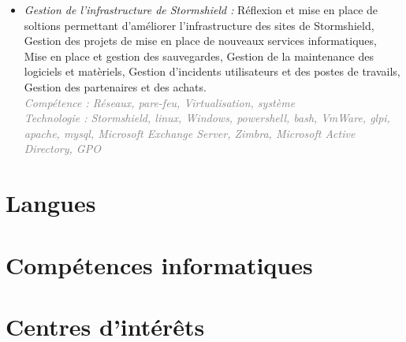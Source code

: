                 {
                \begin{itemize}
					\item \textit{Gestion de l'infrastructure de Stormshield :}
					\tabto{0.3cm} Réflexion et mise en place de soltions permettant d'améliorer l'infrastructure des sites de Stormshield, Gestion des projets de mise en place de nouveaux services informatiques, Mise en place et gestion des sauvegardes, Gestion de la maintenance des logiciels et matèriels, Gestion d'incidents utilisateurs et des postes de travails, Gestion des partenaires et des achats.\\
					\textcolor{gray}{\emph{\scriptsize{Compétence : Réseaux, pare-feu, Virtualisation, système}}}\\
					\textcolor{gray}{\emph{\scriptsize{Technologie : Stormshield, linux, Windows, powershell, bash, VmWare, glpi, apache, mysql, Microsoft Exchange Server, Zimbra, Microsoft Active Directory, GPO}}}
                 \end{itemize}
		} 	
\section{Langues}

\section{Compétences informatiques}

\section{Centres d'intérêts}


